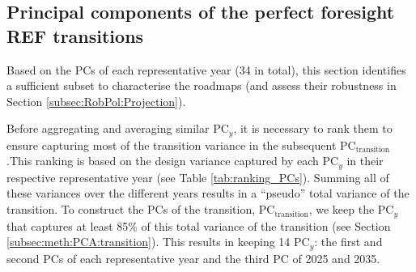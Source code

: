 \subsection{Principal components of the perfect foresight REF transitions}
\label{subsec:RobPol:PC_transition}
Based on the \gls{PCs} of each representative year (34 in total), this section identifies a sufficient subset to characterise the roadmaps (and assess their robustness in Section \ref{subsec:RobPol:Projection}).

Before aggregating and averaging similar $\text{PC}_{y}$, it is necessary to rank them to ensure capturing most of the transition variance in the subsequent $\text{PC}_{\text{transition}}$.This ranking is based on the design variance captured by each $\text{PC}_{y}$ in their respective representative year (see Table \ref{tab:ranking_PCs}). Summing all of these variances over the different years results in a ``pseudo'' total variance of the transition. To construct the \gls{PCs} of the transition, $\text{PC}_{\text{transition}}$, we keep the $\text{PC}_{y}$ that captures at least 85\% of this total variance of the transition (see Section \ref{subsec:meth:PCA:transition}).  This results in keeping 14 $\text{PC}_{y}$: the first and second \gls{PCs} of each representative year and the third PC of 2025 and 2035. 

